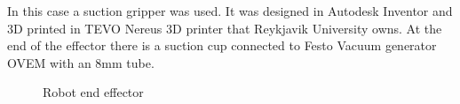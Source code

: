 In this case a suction gripper was used. It was designed in Autodesk Inventor \cite{noauthor_inventor_nodate} and 3D printed in TEVO Nereus 3D printer that Reykjavik University owns. At the end of the effector there is a suction cup connected to Festo Vacuum generator OVEM with an 8mm tube.
\begin{figure}[ht]
    \centering
    \hfill
    \hfill
    \caption{Robot end effector}
    \label{figure: endeffector}
\end{figure}

